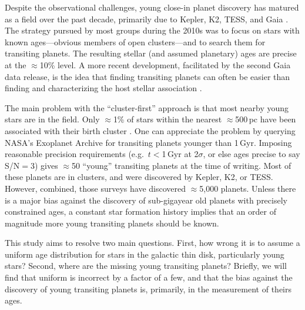\documentclass[11pt,twocolumn,tighten]{aastex63}
\begin{document}
Despite the observational challenges, young close-in planet discovery
has matured as a field over the past decade, primarily due to
Kepler, K2, TESS, and Gaia
\citep[e.g.][]{Meibom_2013,Mann_K2_25_2016,Mann_2017,Curtis_2018,Livingston_2018,David_2019,Bouma_2020_toi837,Rizzuto_2020,Plavchan_2020,Newton_2021,Nardiello_2022,Tofflemire_2021,Barber_2022,Bouma_2022a,Bouma_2022b,Zhou_2022,Zakhozhay_2022,Wood_2023}.
The strategy pursued by most groups during the 2010s was to focus on
stars with known ages---obvious members of open clusters---and to
search them for transiting planets.  The resulting stellar (and assumed planetary) ages are
precise at the $\approx$10\% level.  A
more recent development, facilitated by the second Gaia data release,
is the idea that finding transiting planets can often be easier than
finding and characterizing the host stellar association
\citep[e.g.][]{Tofflemire_2021}.

The main problem with the ``cluster-first'' approach is that most
nearby young stars are in the field.  Only $\approx$1\% of
stars within the nearest $\approx$500\,pc have been associated
with their birth cluster
\citep[e.g.][]{Zari_2018,CantatGaudin_2020,Kounkel_2020,Kerr_2021}.
One can appreciate the problem by querying NASA's Exoplanet Archive
\citep[NEA;][]{2013PASP..125..989A} for transiting planets younger
than 1\,Gyr.  Imposing reasonable precision requirements
(e.g.~$t$$<$1\,Gyr at 2$\sigma$, or else ages precise to say
S/N$=$3) gives $\approx$50 ``young'' transiting planets at the time
of writing.  Most of these planets are in clusters, and were
discovered by Kepler, K2, or TESS.  However, combined, those surveys
have discovered $\approx$5{,}000 planets.  Unless there is a major
bias against the discovery of sub-gigayear old planets with precisely
constrained ages, a constant star formation history implies that
an order of magnitude more young
transiting planets should be known.

This study aims to resolve two main questions.  First, how wrong it is
to assume a uniform age distribution for stars in the galactic thin
disk, particularly young stars?  Second, where are the missing young
transiting planets?  Briefly, we will find that uniform is incorrect
by a factor of a few, and that the bias against the discovery of young
transiting planets is, primarily, in the measurement of
theirs ages. %
\end{document}
